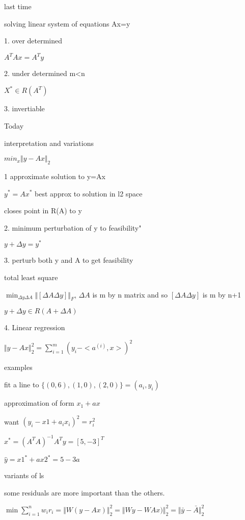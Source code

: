 


last time

solving linear system of equations Ax=y

1. over determined

$A^TAx=A^Ty$


2. under determined m<n

$X^* \in R(A^T)  $ 

3. invertiable





Today

interpretation and variations 


$min_x \Vert y-Ax\Vert_2$

1 approximate solution to y=Ax

$y^*=Ax^*$ best approx to solution in l2 space

closes point in R(A) to y

2. minimum perturbation of y to feasibility"

$y+\Delta y= y^*$

3. perturb both y and A to get feasibility

total least square

$\min_{\Delta y \Delta A} \Vert [\Delta A \Delta y] \Vert_F$, $\Delta A$ is m by n matrix and so $[\Delta A \Delta y]$ is m by n+1



$y+\Delta y\in R(A+\Delta A)$


4. Linear regression

$\Vert y-Ax\Vert ^2_2 = \sum_{i=1}^{m} ( y_i - <a^{(i)} , x>)^2$


examples

fit a line to $\{(0,6),(1,0),(2,0) \}={(a_i,y_i)}$

approximation of form $x_1+ax$

want $(y_i-x1+a_ix_i)^2 = r_i^2$

$x^*=(A^TA)^{-1}A^Ty=[5 , -3]^T$


$\hat{y}=x1^*+ax2^*=5-3a$            %


variants of ls

some residuals are more important than the others.

$\min \sum_{i=1}^{n} w_i r_i=\Vert W (y-Ax)\Vert ^2_2=\Vert Wy-WAx)\Vert ^2_2=\Vert \bar{y}-\bar{A} \Vert ^2_2$

